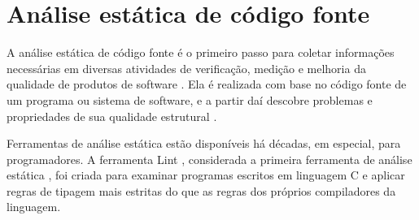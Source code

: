 
\section{Análise estática de código fonte} \label{analise-estatica}

A análise estática de código fonte é o primeiro passo para coletar informações
necessárias em diversas atividades de verificação, medição e melhoria da
qualidade de produtos de software \cite{Cruz2009, Kirkov2010}. Ela é
realizada com base no código fonte de um programa ou sistema de software, e a
partir daí descobre problemas e propriedades de sua qualidade estrutural
\cite{Chess2007}.

Ferramentas de análise estática estão disponíveis há décadas, em especial,
para programadores. A ferramenta Lint \cite{Johnson1978}, considerada a
primeira ferramenta de análise estática \cite{Gosain2015}, foi criada para
examinar programas escritos em linguagem C e aplicar regras de tipagem mais
estritas do que as regras dos próprios compiladores da linguagem.

